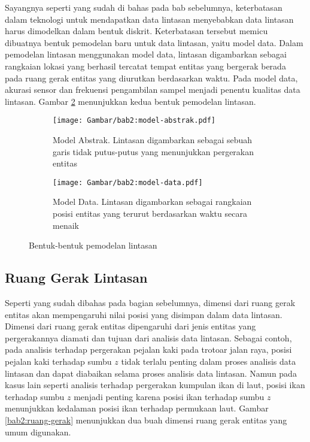 Sayangnya seperti yang sudah di bahas pada bab sebelumnya, keterbatasan dalam teknologi untuk mendapatkan data lintasan menyebabkan data lintasan harus dimodelkan dalam bentuk diskrit. Keterbatasan tersebut memicu dibuatnya bentuk pemodelan baru untuk data lintasan, yaitu model data. Dalam pemodelan lintasan menggunakan model data, lintasan digambarkan sebagai rangkaian lokasi yang berhasil tercatat tempat entitas yang bergerak berada pada ruang gerak entitas yang diurutkan berdasarkan waktu. Pada model data, akurasi sensor dan frekuensi pengambilan sampel menjadi penentu kualitas data lintasan. Gambar \ref{bab2:pemodelan-lintasan} menunjukkan kedua bentuk pemodelan lintasan.

\iffalse 

\lionov{kasih jarak antara gambar kiri dan kanan}.

\fi

\begin{figure}[b]
    \centering
    \begin{subfigure}[b]{0.35\textwidth}
        \centering
        \texttt{[image: Gambar/bab2:model-abstrak.pdf]}
        \caption{Model Abstrak. Lintasan digambarkan sebagai sebuah garis tidak putus-putus yang menunjukkan pergerakan entitas}
        \label{bab2:model-abstrak}
    \end{subfigure} \hspace{2cm}
    \begin{subfigure}[b]{0.35\textwidth}
        \centering
        \texttt{[image: Gambar/bab2:model-data.pdf]}
        \caption{Model Data. Lintasan digambarkan sebagai rangkaian posisi entitas yang terurut berdasarkan waktu secara menaik}
    \end{subfigure}
    \caption{Bentuk-bentuk pemodelan lintasan}
    \label{bab2:pemodelan-lintasan}
\end{figure}

\subsection{Ruang Gerak Lintasan}
\label{subsec:ruang}

Seperti yang sudah dibahas pada bagian sebelumnya, dimensi dari ruang gerak entitas akan mempengaruhi nilai posisi yang disimpan dalam data lintasan. Dimensi dari ruang gerak entitas dipengaruhi dari jenis entitas yang pergerakannya diamati dan tujuan dari analisis data lintasan. Sebagai contoh, pada analisis terhadap pergerakan pejalan kaki pada trotoar jalan raya, posisi pejalan kaki terhadap sumbu $z$ tidak terlalu penting dalam proses analisis data lintasan dan dapat diabaikan selama proses analisis data lintasan. Namun pada kasus lain seperti analisis terhadap pergerakan kumpulan ikan di laut, posisi ikan terhadap sumbu $z$ menjadi penting karena posisi ikan terhadap sumbu $z$ menunjukkan kedalaman posisi ikan terhadap permukaan laut. Gambar \ref{bab2:ruang-gerak} menunjukkan dua buah dimensi ruang gerak entitas yang umum digunakan.

